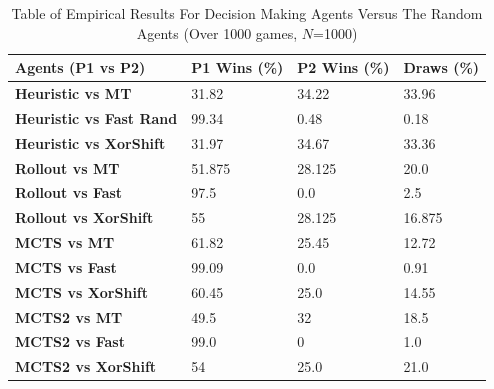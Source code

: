 \documentclass[journal]{IEEEtran}
\begin{document}
\begin{table}[h]
\centering
\caption{Table of Empirical Results For Decision Making Agents Versus The Random Agents (Over 1000 games, $N$=1000)}
\label{results-table-avr}
\begin{tabular}{|l|l|l|l|}
\hline
\textbf{Agents (P1 vs P2)}      & \textbf{P1 Wins (\%)} & \textbf{P2 Wins (\%)} & \textbf{Draws (\%)} \\ \hline
\textbf{Heuristic vs MT}        & 31.82                 & 34.22                 & 33.96               \\ \hline
\textbf{Heuristic vs Fast Rand} & 99.34                 & 0.48                  & 0.18                \\ \hline
\textbf{Heuristic vs XorShift}  & 31.97                 & 34.67                 & 33.36               \\ \hline
\textbf{Rollout vs MT}          & 51.875                & 28.125                & 20.0                \\ \hline
\textbf{Rollout vs Fast}        & 97.5                  & 0.0                   & 2.5                 \\ \hline
\textbf{Rollout vs XorShift}    & 55                    & 28.125                & 16.875              \\ \hline
\textbf{MCTS vs MT}             & 61.82                 & 25.45                 & 12.72               \\ \hline
\textbf{MCTS vs Fast}           & 99.09                 & 0.0                   & 0.91                \\ \hline
\textbf{MCTS vs XorShift}       & 60.45                 & 25.0                  & 14.55               \\ \hline
\textbf{MCTS2 vs MT}            & 49.5                  & 32                    & 18.5                \\ \hline
\textbf{MCTS2 vs Fast}          & 99.0                  & 0                     & 1.0                 \\ \hline
\textbf{MCTS2 vs XorShift}      & 54                    & 25.0                  & 21.0                \\ \hline
\end{tabular}
\end{table}
\end{document}
